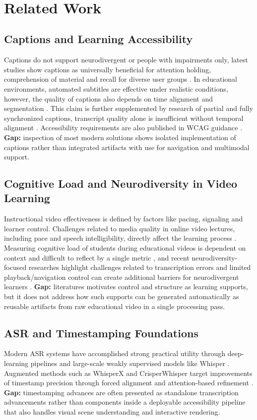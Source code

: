 ﻿﻿\documentclass[conference]{IEEEtran}
\begin{document}
\section{Related Work}
\subsection{Captions and Learning Accessibility}
Captions do not support neurodivergent or people with impairments only, latest studies show captions as universally beneficial for attention holding, comprehension of material and recall for diverse user groups \cite{Gernsbacher2015}. In educational environments, automated subtitles are effective under realistic conditions, however, the quality of captions also depends on time alignment and segmentation \cite{Malakul2023}. This claim is further supplemented by research of partial and fully synchronized captions, transcript quality alone is insufficient without temporal alignment \cite{Mirzaei2018}. Accessibility requirements are also published in WCAG guidance \cite{WCAG21}. \textbf{Gap:} inspection of most modern solutions shows isolated implementation of captions rather than integrated artifacts with use for navigation and multimodal support.

\subsection{Cognitive Load and Neurodiversity in Video Learning}
Instructional video effectiveness is defined by factors like pacing, signaling and learner control. Challenges related to media quality in online video lectures, including pace and speech intelligibility, directly affect the learning process \cite{Lange2020}. Measuring cognitive load of students during educational videos is dependent on context and difficult to reflect by a single metric \cite{Kruger2016},  and recent neurodiversity-focused researches highlight challenges related to transcription errors and limited playback/navigation control can create additional barriers for neurodivergent learners \cite{LeCunff2024,Horlin2024}. \textbf{Gap:} literatures motivates control and structure as learning supports, but it does not address how such supports can be generated automatically as reusable artifacts from raw educational video in a single processing pass.

\subsection{ASR and Timestamping Foundations}
Modern ASR systems have accomplished strong practical utility through deep-learning pipelines \cite{Malik2020} and large-scale weakly supervised models like Whisper \cite{Radford2022}. Augmented methods such as WhisperX and CrisperWhisper target improvements of timestamp precision through forced alignment and attention-based refinement \cite{Bain2023,Wagner2024}. \textbf{Gap:} timestamping advances are often presented as standalone transcription advancements rather than components inside a deployable accessibility pipeline that also handles visual scene understanding and interactive rendering.
\end{document}
